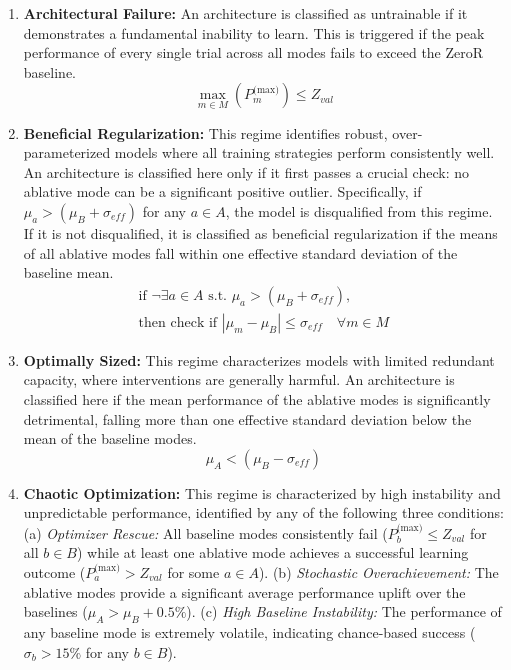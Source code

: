 \documentclass[conference]{IEEEtran}
\begin{document}
\begin{enumerate}
    \item \textbf{Architectural Failure:} An architecture is classified as untrainable if it demonstrates a fundamental inability to learn. This is triggered if the peak performance of every single trial across all modes fails to exceed the ZeroR baseline.
    \begin{equation}
        \max_{m \in M} (P_m^{\text{(max)}}) \le Z_{val}
    \end{equation}

    \item \textbf{Beneficial Regularization:} This regime identifies robust, over-parameterized models where all training strategies perform consistently well. An architecture is classified here only if it first passes a crucial check: no ablative mode can be a significant positive outlier. Specifically, if $\mu_a > (\mu_B + \sigma_{eff})$ for any $a \in A$, the model is disqualified from this regime. If it is not disqualified, it is classified as beneficial regularization if the means of all ablative modes fall within one effective standard deviation of the baseline mean.
    \begin{multline}
        \text{if } \neg\exists a \in A \text{ s.t. } \mu_a > (\mu_B + \sigma_{eff}), \\
        \text{then check if } |\mu_m - \mu_B| \le \sigma_{eff} \quad \forall m \in M
    \end{multline}
    
    \item \textbf{Optimally Sized:} This regime characterizes models with limited redundant capacity, where interventions are generally harmful. An architecture is classified here if the mean performance of the ablative modes is significantly detrimental, falling more than one effective standard deviation below the mean of the baseline modes.
    \begin{equation}
        \mu_A < (\mu_B - \sigma_{eff})
    \end{equation}

    \item \textbf{Chaotic Optimization:} This regime is characterized by high instability and unpredictable performance, identified by any of the following three conditions: (a) \textit{Optimizer Rescue:} All baseline modes consistently fail ($P_b^{\text{(max)}} \le Z_{val}$ for all $b \in B$) while at least one ablative mode achieves a successful learning outcome ($P_a^{\text{(max)}} > Z_{val}$ for some $a \in A$). (b) \textit{Stochastic Overachievement:} The ablative modes provide a significant average performance uplift over the baselines ($\mu_A > \mu_B + 0.5\%$). (c) \textit{High Baseline Instability:} The performance of any baseline mode is extremely volatile, indicating chance-based success ($\sigma_b > 15\%$ for any $b \in B$).


\end{enumerate}
\end{document}
